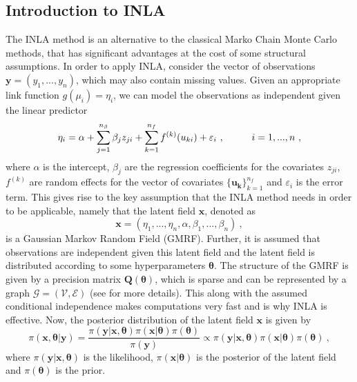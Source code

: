 \subsection{Introduction to INLA}
The INLA method is an alternative to the classical Marko Chain Monte Carlo methods, that has significant advantages at the cost of some structural assumptions. 
In order to apply INLA, consider the vector of observations $\mathbf{y} = (y_1, ..., y_n)$, which may also contain missing values. 
Given an appropriate link function $g(\mu_i)=\eta_i$, we can model the observations as independent given the linear predictor
\begin{equation}
    \eta_i = \alpha + \sum_{j=1}^{n_{\beta}} \beta_j z_{ji} + \sum_{k=1}^{n_{f}} f^{(k)}(u_{ki}) + \varepsilon_i \ , \hspace{10mm} i=1, ..., n \ ,
\end{equation}
where $\alpha$ is the intercept, $\beta_j$ are the regression coefficients for the covariates $z_{ji}$, $f^{(k)}$ are random effects for the vector of covariates $\mathbf{\{u_{k}\}}_{k=1}^{n_f}$ and $\varepsilon_i$ is the error term.
This gives rise to the key assumption that the INLA method needs in order to be applicable, namely that the latent field $\mathbf{x}$, denoted as
\begin{equation}
    \mathbf{x} = (\eta_1, ..., \eta_n, \alpha, \beta_1, ..., \beta_{n}) \ ,
\end{equation}
is a Gaussian Markov Random Field (GMRF). Further, it is assumed that observations are independent given this latent field and the latent field is distributed according to some hyperparameters $\boldsymbol{\theta}$.
The structure of the GMRF is given by a precision matrix $\mathbf{Q(\theta)}$, which is sparse and can be represented by a graph $\mathcal{G} = (\mathcal{V}, \mathcal{E})$ (see  for more details). 
This along with the assumed conditional independence makes computations very fast and is why INLA is effective.
Now, the posterior distribution of the latent field $\boldsymbol{x}$ is given by
\begin{equation}
    \pi(\boldsymbol{x}, \boldsymbol{\theta} \lvert \mathbf{y}) = \frac{\pi(\mathbf{y} \lvert \boldsymbol{x}, \boldsymbol{\theta}) \pi(\boldsymbol{x} \lvert \boldsymbol{\theta}) \pi(\boldsymbol{\theta})}{\pi(\boldsymbol{y})} \propto \pi(\mathbf{y} \lvert \boldsymbol{x}, \boldsymbol{\theta}) \pi(\boldsymbol{x} \lvert \boldsymbol{\theta}) \pi(\boldsymbol{\theta}) \ ,
\end{equation}
where $\pi(\mathbf{y} \lvert \boldsymbol{x}, \boldsymbol{\theta})$ is the likelihood, $\pi(\boldsymbol{x} \lvert \boldsymbol{\theta})$ is the posterior of the latent field and $\pi(\boldsymbol{\theta})$ is the prior.
